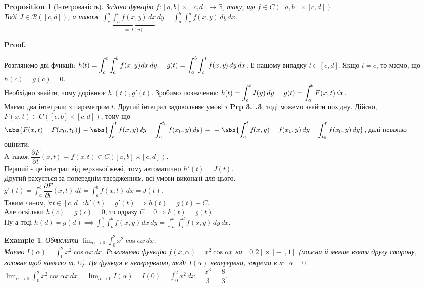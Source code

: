 \documentclass[a4paper, 10pt]{article}
\makeatletter
\def\departial#1#2{\dfrac{\partial {#1}}{\partial {#2}}}
\def\huge{\displaystyle}
\def\qed{$\blacksquare$}
\theoremstyle{theoremdd}
\theoremstyle{theoremdd}
\theoremstyle{theoremdd}
\theoremstyle{theoremdd}
\theoremstyle{theoremdd}
\newtheorem{example}[theorem]{Example}
\theoremstyle{theoremdd}
\newtheorem{proposition}[theorem]{Proposition}
\theoremstyle{theoremdd}
\theoremstyle{theoremdd}
\theoremstyle{theoremdd}
\renewenvironment{proof}[1][Proof.\\]{\par
\pushQED{\hfill \qed}%
\normalfont \topsep6\p@\@plus6\p@\relax
\trivlist
\item\relax
{\bfseries
#1\@addpunct{.}}\hspace\labelsep\ignorespaces
}{%
\popQED\endtrivlist\@endpefalse
}
\makeatother
\begin{document}
\begin{proposition}[Інтегрованість]
Задано функцію $f: [a,b] \times [c,d] \to \mathbb{R}$, таку, що $f \in C([a,b] \times [c,d])$.\\
Тоді $J \in \mathcal{R}([c,d])$, а також $\huge \int_c^d \underbrace{\int_a^b f(x,y)\,dx}_{=J(y)}\,dy = \int_a^b \int_c^d f(x,y)\,dy \,dx$.
\end{proposition}

\begin{proof}
Розглянемо дві функції: $h(t) = \huge \int_c^t \int_a^b f(x,y) \,dx \,dy \hspace{0.5cm} g(t) = \int_a^b \int_c^t f(x,y)\,dy\,dx$. В нашому випадку $t \in [c,d]$. Якщо $t =c$, то маємо, що $h(c) = g(c) = 0$.\\
Необхідно знайти, чому дорівнює $h'(t), g'(t)$. Зробимо позначення: $h(t) = \huge \int_c^t J(y) \,dy \hspace{0.5cm} g(t) = \int_a^b F(x,t)\,dx$.\\
Маємо два інтеграли з параметром $t$. Другий інтеграл задовольняє умові з \textbf{Prp 3.1.3}, тоді можемо знайти похідну. Дійсно,\\
$F(x,t) \in C([a,b] \times [c,d])$, тому що $\huge \abs{F(x,t) - F(x_0,t_0)} = \abs{\int_c^t f(x,y)\,dy - \int_c^{t_0} f(x_0,y)\,dy} = \\ =\abs{\int_c^t f(x,y)-f(x_0,y)\,dy - \int_{t_0}^t f(x_0,y)\,dy}$, далі неважко оцінити.\\
А також $\departial{F}{t}(x,t) = f(x,t) \in C([a,b] \times [c,d])$.\\
Перший - це інтеграл від верхньої межі, тому автоматично $h'(t) = J(t)$.\\
Другий рахується за попереднім твердженням, всі умови виконані для цього.\\
$g'(t) = \huge \int_a^b \departial{F}{t}(x,t)\,dt = \huge \int_a^b f(x,t)\,dx = J(t)$.\\
Таким чином, $\forall t \in [c,d]: h'(t) = g'(t) \implies h(t) = g(t) + C$.\\
Але оскільки $h(c)=g(c)=0$, то одразу $C=0 \Rightarrow h(t) = g(t)$.\\
Ну а тоді $h(d) = g(d) \implies \huge \int_c^b \int_a^b f(x,y)\,dx\,dy = \int_a^b \int_c^d f(x,y)\,dy \,dx$.
\end{proof}

\begin{example}
Обчислити $\huge \lim_{\alpha \to 0} \int_0^2 x^2 \cos \alpha x \,dx$.\\
Маємо $I(\alpha) = \huge\int_0^2 x^2 \cos \alpha x \,dx$. Розглянемо функцію $f(x,\alpha) = x^2 \cos \alpha x$ на $[0,2] \times [-1,1]$ (можна й менше взяти другу сторону, головне щоб навколо т. $0$). Ця функція є неперервною, тоді $I(\alpha)$ неперервна, зокрема в т. $\alpha = 0$.\\
$\huge \lim_{\alpha \to 0} \int_0^2 x^2 \cos \alpha x \,dx = \lim_{\alpha \to 0} I(\alpha) = I(0) = \int_0^2 x^2 \,dx = \dfrac{x^3}{3} = \dfrac{8}{3}$.
\end{example}
\end{document}
